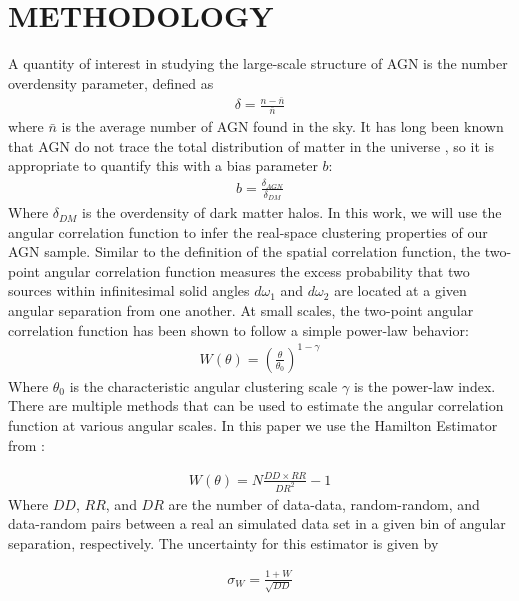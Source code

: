 \documentclass[preprint]{aastex63}
\begin{document}
\section{METHODOLOGY}
A quantity of interest in studying the large-scale structure of AGN is the number overdensity parameter, defined as
\begin{align}
    \label{eq:delta}
    \delta = \frac{n-\bar n}{\bar n}
\end{align}
where $\bar n $ is the average number of AGN found in the sky. It has long been known that AGN do not trace the total
distribution of matter in the universe \citep{bardeen}, so  it is appropriate to quantify this with a bias parameter $b$:
\begin{align}
    \label{eq:bias}
    b = \frac{\delta_{AGN}}{\delta_{DM}}
\end{align}
Where $\delta_{DM}$ is the overdensity of dark matter halos. In this work, we will use the angular correlation function to infer 
the real-space clustering properties of our AGN sample. Similar to the definition of the spatial correlation function, the two-point angular correlation function measures the excess 
 probability that two sources within infinitesimal solid angles $d\omega_1$ and $d\omega_2$ are located at a given angular separation from one another. 
 At small scales, the two-point angular correlation function has been shown to follow a simple power-law behavior:
 \begin{align}
    \label{p_law}
    W(\theta) = \left(\frac{\theta}{\theta_0} \right)^{1-\gamma}
 \end{align}
 Where $\theta_0$ is the characteristic angular clustering scale $\gamma$ is the power-law index.  
 There are multiple methods that can be used to estimate the angular correlation function at various angular scales.
In this paper we use the Hamilton Estimator from \citet{hamilton}:

\begin{align}
    \label{eq:hamilton_corr}
    W(\theta) = N \frac{DD \times RR}{DR^2}-1
\end{align}
Where $DD$, $RR$, and $DR$ are the number of data-data, random-random, and data-random pairs between a real an simulated data set
in a given bin of angular separation, respectively. The uncertainty for this estimator is given by

\begin{align}
    \label{eq:hamilton_sig}
    \sigma_W = \frac{1+W}{\sqrt{DD}}
\end{align}
\end{document}
